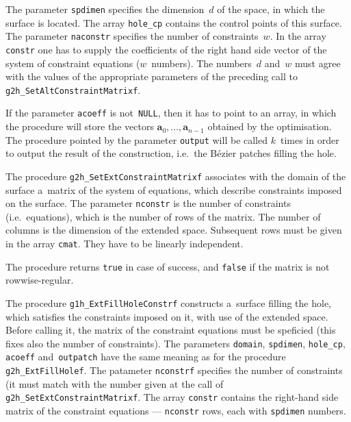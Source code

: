 The parameter \texttt{spdimen} specifies the dimension~$d$ of the space, in
which the surface is located. The array \texttt{hole\_cp} contains the control
points of this surface. The parameter \texttt{naconstr} specifies the number
of constraints~$w$. In the array \texttt{constr} one has to supply the
coefficients of the right hand side vector of the system of constraint equations
($w$~numbers). The numbers~$d$ and~$w$ must agree with the values of the appropriate
parameters of the preceding call to \texttt{g2h\_SetAltConstraintMatrixf}.

If the parameter \texttt{acoeff} is not~\texttt{NULL}, then it has to point
to an array, in which the procedure will store the vectors
$\bm{a}_0,\ldots,\bm{a}_{n-1}$ obtained by the optimisation.
The procedure pointed by the parameter \texttt{output} will be called
$k$~times in order to output the result of the construction, i.e.\ the
B\'{e}zier patches filling the hole.

\vspace{\bigskipamount}
The procedure \texttt{g2h\_SetExtConstraintMatrixf} associates with the domain   
of the surface a~matrix of the system of equations, which describe constraints
imposed on the surface. The parameter \texttt{nconstr} is the number of  
constraints (i.e.\ equations), which is the number of rows of the matrix.
The number of columns is the dimension of the extended space.
Subsequent rows must be given in the array \texttt{cmat}. They have to be
linearly independent.

The procedure returns \texttt{true} in case of success, and \texttt{false}
if the matrix is not rowwise-regular.

\vspace{\bigskipamount}
The procedure \texttt{g1h\_ExtFillHoleConstrf} constructs a~surface filling the
hole, which satisfies the constraints imposed on it, with use of the  
extended space. Before calling it, the matrix of the constraint equations
must be speficied (this fixes also the number of constraints).
The parameters \texttt{domain}, \texttt{spdimen},
\texttt{hole\_cp}, \texttt{acoeff} and~\texttt{outpatch} have the same meaning as
for the procedure \texttt{g2h\_ExtFillHolef}. The patameter \texttt{nconstrf}
specifies the number of constraints (it must match with the number given
at the call of \texttt{g2h\_SetExtConstraintMatrixf}. The array \texttt{constr}
contains the right-hand side matrix of the constraint equations
--- \texttt{nconstr} rows, each with \texttt{spdimen} numbers.

